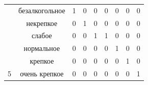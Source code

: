 \begin{table}[H]
\begin{center}
\begin{tabular}{|c|c|ccccccc|}
		{\color[HTML]{333333} }                                                    & безалкогольное                                 & \multicolumn{1}{c|}{1}                        & \multicolumn{1}{c|}{0}                        & \multicolumn{1}{c|}{0}     & \multicolumn{1}{c|}{0}      & \multicolumn{1}{c|}{0}      & \multicolumn{1}{c|}{0}        & \multicolumn{1}{c|}{0}  \\ \cline{2-9}
		{\color[HTML]{333333} }                                                    & {\color[HTML]{333333} некрепкое}    & \multicolumn{1}{c|}{{\color[HTML]{333333} 0}} & \multicolumn{1}{c|}{{\color[HTML]{333333} 1}} & \multicolumn{1}{c|}{0}      & \multicolumn{1}{c|}{0}      & \multicolumn{1}{c|}{0}      & \multicolumn{1}{c|}{0}        & \multicolumn{1}{c|}{0}                       \\ \cline{2-9}
		{\color[HTML]{333333} }                                                    & {\color[HTML]{333333} слабое}    & \multicolumn{1}{c|}{{\color[HTML]{333333} 0}} & \multicolumn{1}{c|}{{\color[HTML]{333333} 0}} & \multicolumn{1}{c|}{1}     & \multicolumn{1}{c|}{1}      & \multicolumn{1}{c|}{0}      & \multicolumn{1}{c|}{0}        & \multicolumn{1}{c|}{0}                       \\ \cline{2-9}
		{\color[HTML]{333333} }                                                    & {\color[HTML]{333333} нормальное}             & \multicolumn{1}{c|}{{\color[HTML]{333333} 0}} & \multicolumn{1}{c|}{{\color[HTML]{333333} 0}} & \multicolumn{1}{c|}{0}     & \multicolumn{1}{c|}{0}      & \multicolumn{1}{c|}{1}      & \multicolumn{1}{c|}{0}        & \multicolumn{1}{c|}{0}                       \\ \cline{2-9}
		{\color[HTML]{333333} }                                                    & {\color[HTML]{333333} крепкое}       & \multicolumn{1}{c|}{{\color[HTML]{333333} 0}} & \multicolumn{1}{c|}{{\color[HTML]{333333} 0}} & \multicolumn{1}{c|}{0}     & \multicolumn{1}{c|}{0}      & \multicolumn{1}{c|}{0}      & \multicolumn{1}{c|}{1}        & \multicolumn{1}{c|}{0}                       \\ \cline{2-9}
		\multirow{-6}{*}{{\color[HTML]{333333} 5}}                                 & {\color[HTML]{333333} очень крепкое  } & \multicolumn{1}{c|}{{\color[HTML]{333333} 0}} & \multicolumn{1}{c|}{{\color[HTML]{333333} 0}} & \multicolumn{1}{c|}{0}     & \multicolumn{1}{c|}{0}      & \multicolumn{1}{c|}{0}      & \multicolumn{1}{c|}{0}        & \multicolumn{1}{c|}{1}                       \\ \cline{1-9}
	\end{tabular}
	\end{center}
\end{table}

